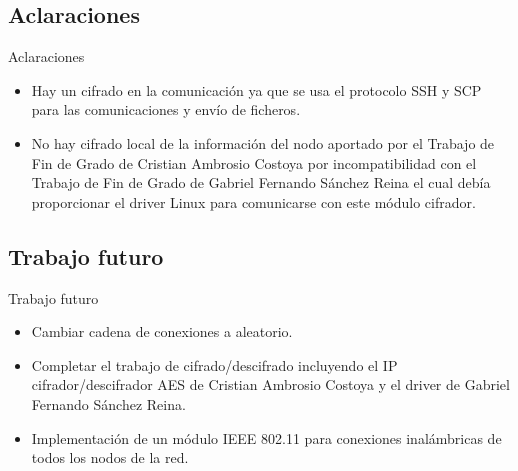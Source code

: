 \documentclass[aspectratio=169]{beamer}
\begin{document}
\subsection{Aclaraciones}
\begin{frame}{Aclaraciones}
	\begin{itemize}
		\item Hay un cifrado en la comunicación ya que se usa el protocolo SSH y SCP para las comunicaciones y envío de ficheros.
		\item No hay cifrado local de la información del nodo aportado por el Trabajo de Fin de Grado de Cristian Ambrosio Costoya por incompatibilidad con el Trabajo de Fin de Grado de Gabriel Fernando Sánchez Reina el cual debía proporcionar el driver Linux para comunicarse con este módulo cifrador.
	\end{itemize}
\end{frame}

\subsection{Trabajo futuro}
\begin{frame}{Trabajo futuro}
\begin{itemize}
	\item Cambiar cadena de conexiones a aleatorio.
	\item Completar el trabajo de cifrado/descifrado incluyendo el IP cifrador/descifrador AES de Cristian Ambrosio Costoya y el driver de Gabriel Fernando Sánchez Reina.
	\item Implementación de un módulo IEEE 802.11 para conexiones inalámbricas de todos los nodos de la red.
\end{itemize}
\end{frame}
\end{document}
